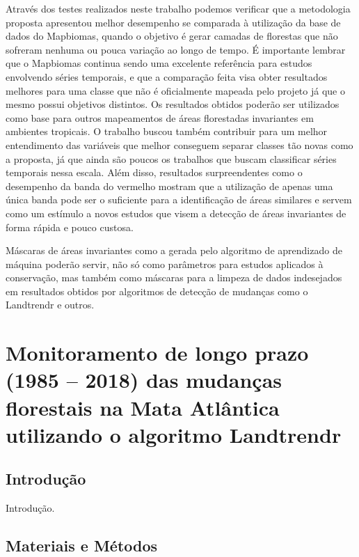 \documentclass[12pt,a4paper]{article}
\begin{document}
\hspace{13pt} Através dos testes realizados neste trabalho podemos verificar que a metodologia proposta apresentou melhor desempenho se comparada à utilização da base de dados do Mapbiomas, quando o objetivo é gerar camadas de florestas que não sofreram nenhuma ou pouca variação ao longo de tempo. É importante lembrar que o Mapbiomas continua sendo uma excelente referência para estudos envolvendo séries temporais, e que a comparação feita visa obter resultados melhores para uma classe que não é oficialmente mapeada pelo projeto já que o mesmo possui objetivos distintos. Os resultados obtidos poderão ser utilizados como base para outros mapeamentos de áreas florestadas invariantes em ambientes tropicais. O trabalho buscou também contribuir para um melhor entendimento das variáveis que melhor conseguem separar classes tão novas como a proposta, já que ainda são poucos os trabalhos que buscam classificar séries temporais nessa escala. Além disso, resultados surpreendentes como o desempenho da banda do vermelho mostram que a utilização de apenas uma única banda pode ser o suficiente para a identificação de áreas similares e servem como um estímulo a novos estudos que visem a detecção de áreas invariantes de forma rápida e pouco custosa.

Máscaras de áreas invariantes como a gerada pelo algoritmo de aprendizado de máquina poderão servir, não só como parâmetros para estudos aplicados à conservação, mas também como máscaras para a limpeza de dados indesejados em resultados obtidos por algoritmos de detecção de mudanças como o Landtrendr e outros.

\newpage
\section{Monitoramento de longo prazo (1985 – 2018) das mudanças florestais na Mata Atlântica utilizando o algoritmo Landtrendr}
\subsection{Introdução}
\hspace{13pt} Introdução.

\subsection{Materiais e Métodos}
\end{document}
